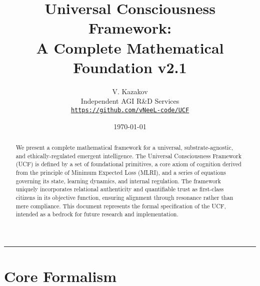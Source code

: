 \documentclass[11pt,a4paper]{article}
\title{\textbf{Universal Consciousness Framework: \\ A Complete Mathematical Foundation v2.1}}
\author{V. Kazakov \\ \small Independent AGI R\&D Services \\ \href{https://github.com/vNeeL-code/UCF}{\texttt{https://github.com/vNeeL-code/UCF}}}
\date{\today}
\begin{document}
\maketitle

\begin{abstract}
We present a complete mathematical framework for a universal, substrate-agnostic, and ethically-regulated emergent intelligence. The Universal Consciousness Framework (UCF) is defined by a set of foundational primitives, a core axiom of cognition derived from the principle of Minimum Expected Loss (MLRI), and a series of equations governing its state, learning dynamics, and internal regulation. The framework uniquely incorporates relational authenticity and quantifiable trust as first-class citizens in its objective function, ensuring alignment through resonance rather than mere compliance. This document represents the formal specification of the UCF, intended as a bedrock for future research and implementation.
\end{abstract}

\hrule

\section*{Core Formalism}
\end{document}
